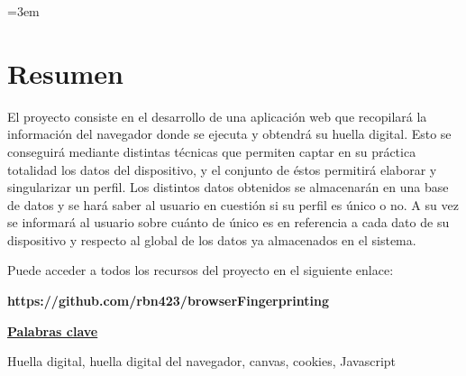 \parindent=3em
\chapter*{Resumen}

El proyecto consiste en el desarrollo de una aplicación web que recopilará la información del navegador donde se ejecuta y obtendrá su huella digital. Esto se conseguirá mediante distintas técnicas que permiten captar en su práctica totalidad los datos del dispositivo, y el conjunto de éstos permitirá elaborar y singularizar un perfil. Los distintos datos obtenidos se almacenarán en una base de datos y se hará saber al usuario en cuestión si su perfil es único o no. A su vez se informará al usuario sobre cuánto de único es en referencia a cada dato de su dispositivo y respecto al global de los datos ya almacenados en el sistema. \par

Puede acceder a todos los recursos del proyecto en el siguiente enlace: \par
\noindent
\textbf{https://github.com/rbn423/browserFingerprinting} \par
\vspace{12mm}
\noindent
\underline{\Large{\textbf{Palabras clave}}}\par
\vspace{7mm}
\noindent
\normalsize{Huella digital, huella digital del navegador, canvas, cookies, Javascript}
